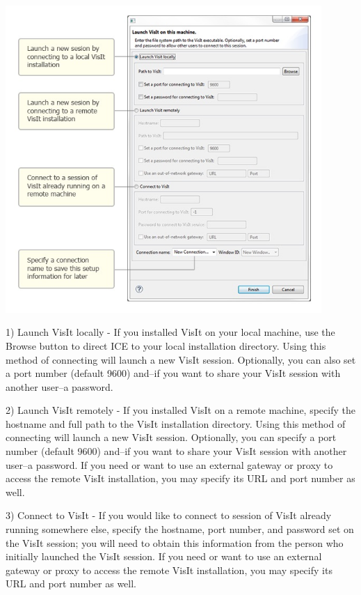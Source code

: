 \documentclass{article}
\begin{document}
\begin{center}
\includegraphics[width=12cm]{images/ICE_VisItLaunchOptions}
\end{center}

1) Launch VisIt locally - If you installed VisIt on your local machine, use the
Browse button to direct ICE to your local installation directory. Using this
method of connecting will launch a new VisIt session. Optionally, you can also
set a port number (default 9600) and--if you want to share your VisIt session
with another user--a password.

2) Launch VisIt remotely - If you installed VisIt on a remote machine, specify
the hostname and full path to the VisIt installation directory. Using this
method of connecting will launch a new VisIt session. Optionally, you can
specify a port number (default 9600) and--if you want to share your VisIt
session with another user--a password. If you need or want to use an external
gateway or proxy to access the remote VisIt installation, you may specify its
URL and port number as well.

3) Connect to VisIt - If you would like to connect to session of VisIt already
running somewhere else, specify the hostname, port number, and password set on
the VisIt session; you will need to obtain this information from the person who
initially launched the VisIt session. If you need or want to use an external
gateway or proxy to access the remote VisIt installation, you may specify its
URL and port number as well.
\end{document}
